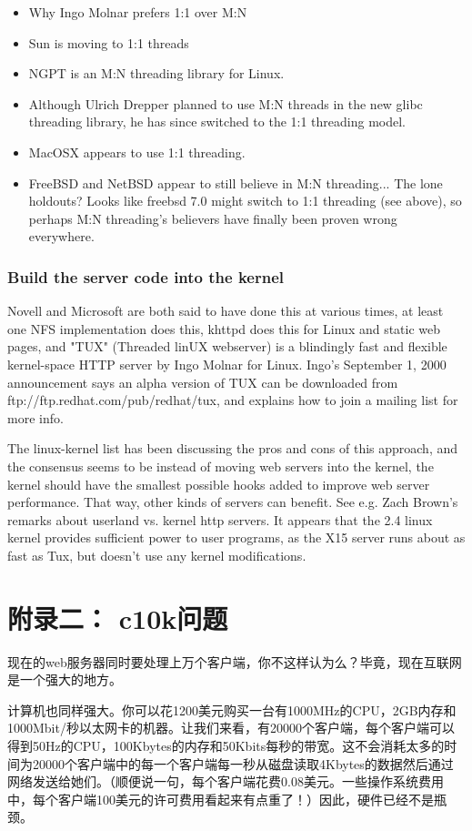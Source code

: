 \documentclass[12pt, twoside, a4paper, xetex]{report}
\begin{document}
\begin{itemize}
\item Why Ingo Molnar prefers 1:1 over M:N
\item Sun is moving to 1:1 threads
\item NGPT is an M:N threading library for Linux.
\item Although Ulrich Drepper planned to use M:N threads in the new glibc threading library, he has since switched to the 1:1 threading model.
\item MacOSX appears to use 1:1 threading.
\item FreeBSD and NetBSD appear to still believe in M:N threading... The lone holdouts? Looks like freebsd 7.0 might switch to 1:1 threading (see above), so perhaps M:N threading's believers have finally been proven wrong everywhere.
\end{itemize}

\subsection*{Build the server code into the kernel}

Novell and Microsoft are both said to have done this at various times, at least one NFS implementation does this, khttpd does this for Linux and static web pages, and "TUX" (Threaded linUX webserver) is a blindingly fast and flexible kernel-space HTTP server by Ingo Molnar for Linux. Ingo's September 1, 2000 announcement says an alpha version of TUX can be downloaded from ftp://ftp.redhat.com/pub/redhat/tux, and explains how to join a mailing list for more info. 

The linux-kernel list has been discussing the pros and cons of this approach, and the consensus seems to be instead of moving web servers into the kernel, the kernel should have the smallest possible hooks added to improve web server performance. That way, other kinds of servers can benefit. See e.g. Zach Brown's remarks about userland vs. kernel http servers. It appears that the 2.4 linux kernel provides sufficient power to user programs, as the X15 server runs about as fast as Tux, but doesn't use any kernel modifications.


\chapter{附录二： c10k问题}
	现在的web服务器同时要处理上万个客户端，你不这样认为么？毕竟，现在互联网是一个强大的地方。
	
	计算机也同样强大。你可以花1200美元购买一台有1000MHz的CPU，2GB内存和1000Mbit/秒以太网卡的机器。让我们来看，有20000个客户端，每个客户端可以得到50Hz的CPU，100Kbytes的内存和50Kbits每秒的带宽。这不会消耗太多的时间为20000个客户端中的每一个客户端每一秒从磁盘读取4Kbytes的数据然后通过网络发送给她们。（顺便说一句，每个客户端花费0.08美元。一些操作系统费用中，每个客户端100美元的许可费用看起来有点重了！）因此，硬件已经不是瓶颈。
	
\end{document}
